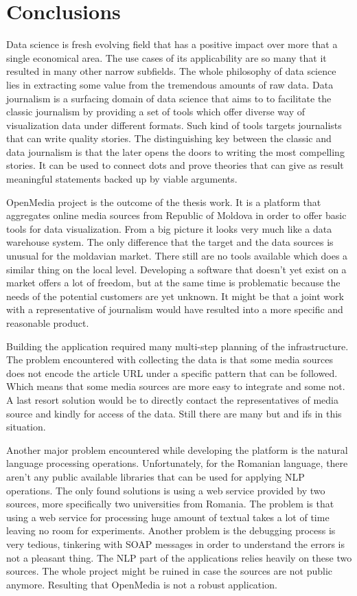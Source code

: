 \section*{Conclusions}
Data science is fresh evolving field that has a positive impact over more that a single economical area. The use cases of its applicability are so many that it resulted in many other narrow subfields. The whole philosophy of data science lies in extracting some value from the tremendous amounts of raw data. Data journalism is a surfacing domain of data science that aims to to facilitate the classic journalism by providing a set of tools which offer diverse way of visualization data under different formats. Such kind of tools targets journalists that can write quality stories. The distinguishing key between the classic and data journalism is that the later opens the doors to writing the most compelling stories. It can be used to connect dots and prove theories that can give as result meaningful statements backed up by viable arguments.

OpenMedia project is the outcome of the thesis work. It is a platform that aggregates online media sources from Republic of Moldova in order to offer basic tools for data visualization. From a big picture it looks very much like a data warehouse system. The only difference that the target and the data sources is unusual for the moldavian market. There still are no tools available which does a similar thing on the local level. Developing a software that doesn't yet exist on a market offers a lot of freedom, but at the same time is problematic because the needs of the potential customers are yet unknown. It might be that a joint work with a representative of journalism would have resulted into a more specific and reasonable product.

Building the application required many multi-step planning of the infrastructure. The problem encountered with collecting the data is that some media sources does not encode the article URL under a specific pattern that can be followed. Which means that some media sources are more easy to integrate and some not. A last resort solution would be to directly contact the representatives of media source and kindly for access of the data. Still there are many but and ifs in this situation.

Another major problem encountered while developing the platform is the natural language processing operations. Unfortunately, for the Romanian language, there aren't any public available libraries that can be used for applying NLP operations. The only found solutions is using a web service provided by two sources, more specifically two universities from Romania. The problem is that using a web service for processing huge amount of textual takes a lot of time leaving no room for experiments. Another problem is the debugging process is very tedious, tinkering with SOAP messages in order to understand the errors is not a pleasant thing. The NLP part of the applications relies heavily on these two sources. The whole project might be ruined in case the sources are not public anymore. Resulting that OpenMedia is not a robust application.

